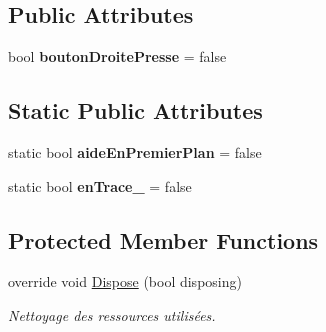 \subsection*{Public Attributes}
\begin{DoxyCompactItemize}
\item 
bool {\bfseries bouton\+Droite\+Presse} = false
\end{DoxyCompactItemize}
\subsection*{Static Public Attributes}
\begin{DoxyCompactItemize}
\item 
static bool {\bfseries aide\+En\+Premier\+Plan} = false
\item 
static bool {\bfseries en\+Trace\+\_\+} = false
\end{DoxyCompactItemize}
\subsection*{Protected Member Functions}
\begin{DoxyCompactItemize}
\item 
override void \hyperlink{class_interface_graphique_1_1_edition_ad3404dbef381fe04da6db94114d6bcc0}{Dispose} (bool disposing)
\begin{DoxyCompactList}\small\item\em Nettoyage des ressources utilisées. \end{DoxyCompactList}\end{DoxyCompactItemize}
